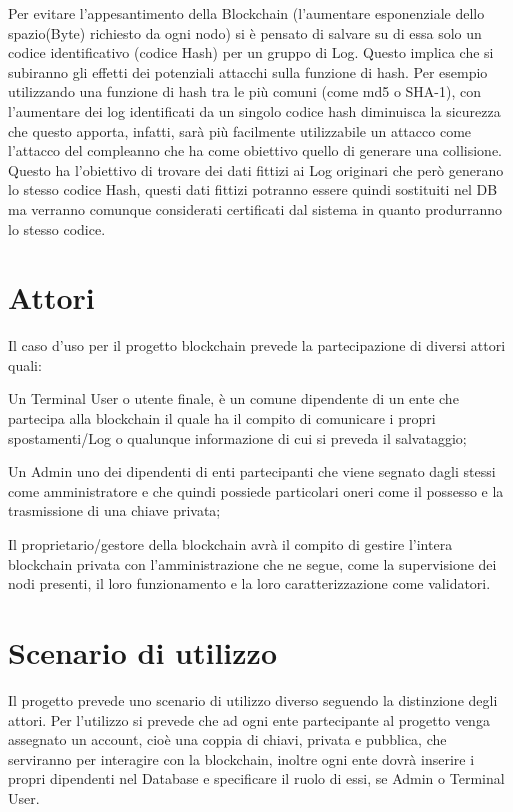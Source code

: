 \documentclass[11pt,a4paper,titlepage, twoside, openright]{report}
\begin{document}
Per evitare l'appesantimento della Blockchain (l'aumentare esponenziale dello spazio(Byte) richiesto da ogni nodo) si è pensato di salvare su di essa solo un codice identificativo (codice Hash) per un gruppo di Log. Questo implica che si subiranno gli effetti dei potenziali attacchi sulla funzione di hash. Per esempio utilizzando una funzione di hash tra le più comuni (come md5 o SHA-1), con l'aumentare dei log identificati da un singolo codice hash diminuisca la sicurezza che questo apporta, infatti, sarà più facilmente utilizzabile un attacco come l'attacco del compleanno che ha come obiettivo quello di generare una collisione. Questo ha l'obiettivo di trovare dei dati fittizi ai Log originari che però generano lo stesso codice Hash, questi dati fittizi potranno essere quindi sostituiti nel DB ma verranno comunque considerati certificati dal sistema in quanto produrranno lo stesso codice.

\section{Attori}
Il caso d'uso per il progetto blockchain prevede la partecipazione di diversi attori quali: 

Un Terminal User o utente finale, è un comune dipendente di un ente che partecipa alla blockchain il quale ha il compito di comunicare i propri spostamenti/Log o qualunque informazione di cui si preveda il salvataggio;

Un Admin uno dei dipendenti di enti partecipanti che viene segnato dagli stessi come amministratore e che quindi possiede  particolari oneri come il possesso e la trasmissione di una chiave privata;

Il proprietario/gestore della blockchain avrà il compito di gestire l'intera blockchain privata con l'amministrazione che ne segue, come la supervisione dei nodi presenti, il loro funzionamento e la loro caratterizzazione come validatori. 

\section{Scenario di utilizzo}
Il progetto prevede uno scenario di utilizzo diverso seguendo la distinzione degli attori.
Per l'utilizzo si prevede che ad ogni ente partecipante al progetto venga assegnato un account, cioè una coppia di chiavi, privata e pubblica, che serviranno per interagire con la blockchain, inoltre ogni ente dovrà inserire i propri dipendenti nel Database e specificare il ruolo di essi, se Admin o Terminal User.
\end{document}
